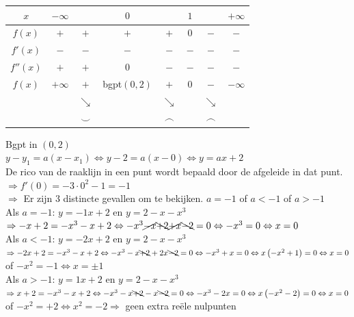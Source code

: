 \documentclass[a4paper]{article}
\newcommand{\asa}{\Leftrightarrow} %
\newcommand{\adR}{\Rightarrow} %
\newcommand{\Lh}{\left(} %
\newcommand{\Rh}{\right)}
\newcommand{\schrap}{\cancel}
\newcommand{\schrapb}{\bcancel} %
\newcommand{\dalend}{\searrow} %
\begin{document}
\begin{tabular}{c|cc|c|c|c|cc}
  $x$       &  $-\infty$  &             &  $0$                 &             &  $1$  &             &  $+\infty$ \\ \hline
  $f(x)$    &  $+$        &  $+$        &  $+$                 &  $+$        &  $0$  &  $-$        &  $-$   \\ \hline
  $f'(x)$   &  $-$        &  $-$        &  $-$                 &  $-$        &  $-$  &  $-$        &  $-$   \\ \hline
  $f''(x)$  &  $+$        &  $+$        &  $0$                 &  $-$        &  $-$  &  $-$        &  $-$   \\ \hline
  $f(x)$    &  $+\infty$  &  $+$        &  bgpt$\Lh 0, 2 \Rh$  &  $+$        &  $0$  &  $-$        &  $-\infty$ \\ 
            &             &  $\dalend$  &                      &  $\dalend$  &       &  $\dalend$  &     \\
            &             &  $\smile$   &                      &  $\frown$   &       &  $\frown$   &     
\end{tabular}

Bgpt in $(0,2)$\\

$y - y_1 = a (x - x_1) \asa y -2 = a (x-0) \asa y = ax +2$\\

De rico van de raaklijn in een punt wordt bepaald door de afgeleide in dat punt.\\

$\adR f'(0) = -3 \cdot 0^2 -1 = -1$\\

$\adR$ Er zijn 3 distincte gevallen om te bekijken. $a = -1$ of $a < -1$ of $a > -1$\\

Als $a = -1$:  $y = -1x +2$ en $y = 2 -x -x^3$ $\adR -x +2 = -x^3 -x +2 \asa -x^3 \schrap{-x} \schrapb{+2} \schrap{+x} \schrapb{-2} = 0 \asa -x^3 = 0 \asa x = 0$\\

Als $a < -1$:  $y = -2x +2$ en $y = 2 -x -x^3$ $\adR -2x +2 = -x^3 -x +2 \asa -x^3 -x \schrapb{+2} +2x \schrapb{-2} = 0 \asa -x^3 +x = 0 \asa x \Lh -x^2 +1 \Rh = 0 \asa x = 0$ of $-x^2 = -1 \asa x = \pm 1$\\

Als $a > -1$:  $y = 1x +2$ en $y = 2 -x -x^3$ $\adR x +2 = -x^3 -x +2 \asa -x^3 -x \schrapb{+2} -x \schrapb{-2} = 0 \asa -x^3 -2x = 0 \asa x \Lh -x^2 -2 \Rh = 0 \asa x = 0$ of $-x^2 = +2 \asa  x^2 = -2 \adR$ geen extra reële nulpunten\\
\end{document}
